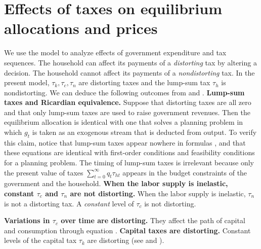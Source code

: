 \section{Effects of taxes on equilibrium allocations and prices}

   We use the model  to analyze  effects of
government expenditure and tax sequences.
The household can affect its payments of a {\it distorting\/} tax
by altering a decision. The household cannot affect its payments of a {\it nondistorting\/}
tax.
In the present model,  $\tau_k, \tau_c, \tau_n$ are distorting taxes
and the lump-sum tax $\tau_h$ is nondistorting.
%
%
We can deduce
 the following
outcomes
from  and .
\medskip
{}  {\bf Lump-sum taxes and Ricardian equivalence.}
Suppose that  distorting taxes are all zero and that
only lump-sum taxes are used to raise government revenues.  Then
the equilibrium allocation is identical with  one that solves a
planning problem in which $g_t$ is taken as an exogenous
stream that is deducted from output.
To verify this claim, notice that lump-sum taxes appear nowhere
in formulas , and that these equations are identical
with first-order conditions and feasibility conditions for
a planning problem.
The timing of lump-sum taxes is irrelevant because only
the present value of taxes $\sum_{t=0}^\infty q_t \tau_{ht}$ appears in
the budget constraints of the government and the household.
\medskip
{}  {\bf
When the labor supply is inelastic,
 constant $\tau_c$ and $\tau_n$ are not distorting.}
 When the labor supply is inelastic, $\tau_n$  is not
a distorting tax.    A  {\it constant\/} level of    $\tau_c$ is
not distorting.


\medskip
{}  {\bf Variations in $\tau_c$ over time are distorting.}
They affect the path of capital and consumption through equation
.
\medskip
{}  {\bf Capital taxes are distorting.}
 Constant levels of  the capital tax $\tau_k$ are distorting (see  and
).


%

